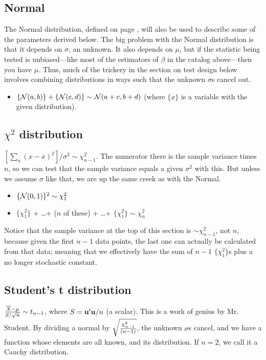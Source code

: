 \subsection{Normal} 

The Normal distribution, defined on page \pageref{normal},
will also be used to describe some of the parameters derived below.
The big problem with the Normal distribution is that it depends on $\sigma$, an
unknown. It also depends on $\mu$, but if the statistic
being tested is unbiased---like most of the estimators of $\beta$ in the
catalog above---then you have $\mu$. Thus, much of the trickery in the
section on test design below involves combining distributions in ways
such that the unknown $\sigma$s cancel out.

\begin{itemize}
\item $\{{\cal N} (a,b)\} + \{{\cal N} (c,d)\} \sim {\cal N}
(a+c,b+d)$ (where $\{x\}$ is a variable with the given distribution).
\end{itemize}

\subsection{$\chi^2$ distribution} $[\sum_n (x-\overline
x)^2]/\sigma^2\sim \chi^2_{n-1}$. The numerator there is the sample
variance times $n$, so we can test that the sample variance equals a
given $\sigma^2$ with this. But unless we assume $\sigma$ like that,
we are up the same creek as with the Normal.

\begin{itemize}
\item $\{{\cal N} (0,1)\}^2 \sim \chi^2_1$

\item $\{\chi^2_1\}$ + \dots + ($n$ of these) + \dots + $\{\chi^2_1\} \sim \chi^2_n$

\end{itemize}			\label{chisq}

Notice that the sample variance at the top of this section is $\sim
\chi^2_{n-1}$, not $n$, because given the first $n-1$ data points, the
last one can actually be calculated from that data; meaning that we
effectively have the sum of $n-1$ $\{\chi^2_1\}$s plus a no longer
stochastic constant.

\subsection{Student's t distribution}  ${\overline X - \mu \over S/\sqrt{n}}\sim
t_{n-1}$, where $S={\bf u}'{\bf u}/n$ (a scalar). This is a work of genius by
Mr. Student.  By dividing a normal by $\sqrt{\chi^2_{n-1}\over (n-1)}$, the
unknown $\sigma$s cancel, and we have a function whose elements are all
known, and its distribution.  If $n=2$, we call it a Cauchy distribution.
\label{tstat}


